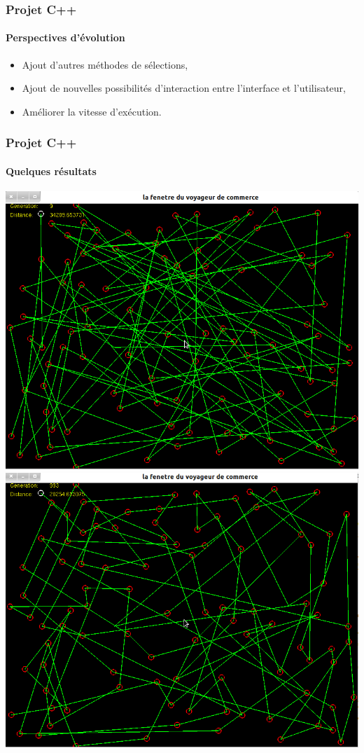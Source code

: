 \documentclass{beamer}
\begin{document}
	\begin{frame}
	\frametitle{Projet C++}
	\framesubtitle{Perspectives d'évolution}
		\begin{itemize}
		\item Ajout d'autres méthodes de sélections,
		\item Ajout de nouvelles possibilités d'interaction entre l'interface et l'utilisateur,
		\item Améliorer la vitesse d'exécution. 
		\end{itemize}			
	\end{frame}
	
	\begin{frame}
	\frametitle{Projet C++}
	\framesubtitle{Quelques résultats}
	
	\includegraphics[scale=0.2]{1.png}
	\includegraphics[scale=0.2]{2.png}
			
	\end{frame}
	
\end{document}

